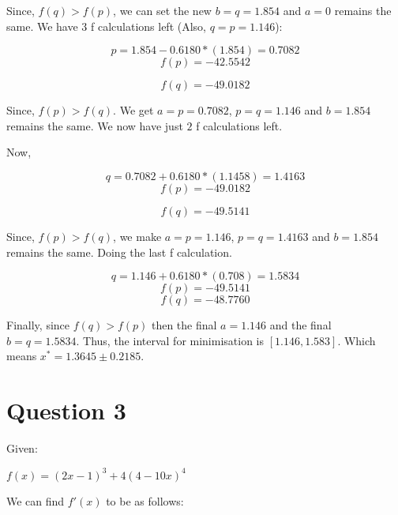 \documentclass[a4paper]{article}
\begin{document}
Since, $f(q) > f(p)$, we can set the new $b = q = 1.854$ and $a = 0$ remains the same. We have $3$ f calculations left (Also, $q = p = 1.146$):

\begin{equation}
p = 1.854  - 0.6180*(1.854) = 0.7082
\end{equation}
\begin{equation}
f(p) = -42.5542
\end{equation}

\begin{equation}
f(q) = -49.0182
\end{equation}

Since, $f(p) > f(q)$. We get $a = p = 0.7082 $, $p = q = 1.146$ and $b = 1.854$ remains the same. We now have just $2$ f calculations left. 

Now, 

\begin{equation}
q = 0.7082 + 0.6180*(1.1458) = 1.4163
\end{equation}
\begin{equation}
f(p) = -49.0182
\end{equation}

\begin{equation}
f(q) = -49.5141
\end{equation}

Since, $f(p) > f(q)$, we make $a = p = 1.146$, $p = q = 1.4163$ and $b = 1.854$ remains the same. Doing the last f calculation. 

\begin{equation}
q = 1.146 + 0.6180*(0.708) = 1.5834
\end{equation}
\begin{equation}
f(p) = -49.5141
\end{equation}
\begin{equation}
f(q) = -48.7760
\end{equation}

Finally, since $f(q) > f(p)$ then the final $a = 1.146$ and the final $b = q = 1.5834$. Thus, the interval for minimisation is $[1.146, 1.583]$.  Which means $x^* = 1.3645 \pm 0.2185$.

\section*{Question 3}

Given:

$
f(x) = (2x − 1)^3 + 4(4 − 10x)^4
$

We can find $f'(x)$ to be as follows:
\end{document}
